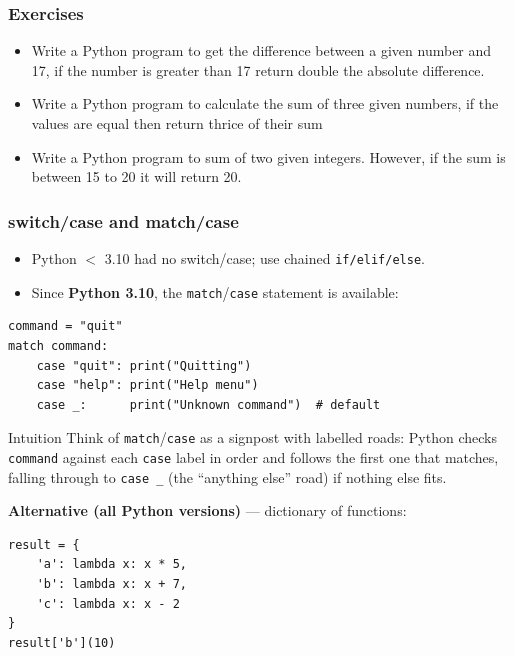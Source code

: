 \begin{frame}[fragile]\frametitle{Exercises}
\begin{itemize}
\item Write a Python program to get the difference between a given number and 17, if the number is greater than 17 return double the absolute difference.
\item Write a Python program to calculate the sum of three given numbers, if the values are equal then return thrice of their sum
\item Write a Python program to sum of two given integers. However, if the sum is between 15 to 20 it will return 20.
\end{itemize}
\end{frame}



\begin{frame}[fragile]\frametitle{switch/case and match/case}
  \begin{itemize}
\item Python $<$ 3.10 had no switch/case; use chained \texttt{if/elif/else}.
\item Since \textbf{Python 3.10}, the \texttt{match}/\texttt{case} statement is available:
\end{itemize}
\begin{lstlisting}
command = "quit"
match command:
    case "quit": print("Quitting")
    case "help": print("Help menu")
    case _:      print("Unknown command")  # default
\end{lstlisting}
\begin{block}{Intuition}
Think of \texttt{match}/\texttt{case} as a signpost with labelled roads: Python checks \texttt{command} against each \texttt{case} label in order and follows the first one that matches, falling through to \texttt{case \_} (the ``anything else'' road) if nothing else fits.
\end{block}
\textbf{Alternative (all Python versions)} --- dictionary of functions:
\begin{lstlisting}
result = {
	'a': lambda x: x * 5,
	'b': lambda x: x + 7,
	'c': lambda x: x - 2
}
result['b'](10)
\end{lstlisting}

\end{frame}

